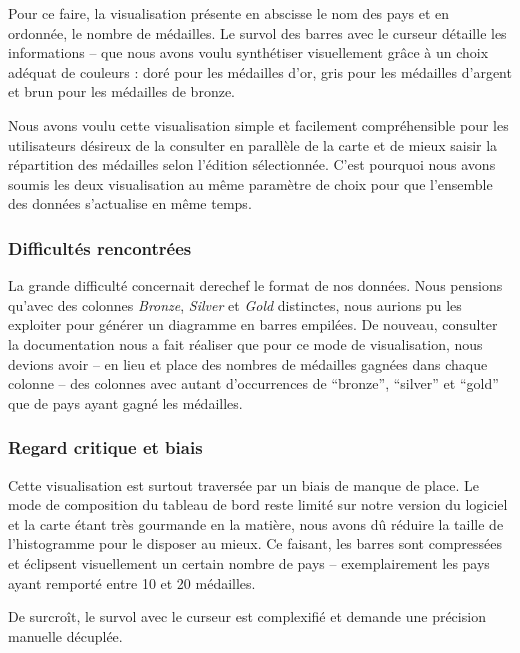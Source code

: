 \documentclass[hidelinks, 12pt]{report}
\begin{document}
Pour ce faire, la visualisation présente en abscisse le nom des pays et en ordonnée, le nombre de médailles. Le survol des barres avec le curseur détaille les informations -- que nous avons voulu synthétiser visuellement grâce à un choix adéquat de couleurs : doré pour les médailles d'or, gris pour les médailles d'argent et brun pour les médailles de bronze.

Nous avons voulu cette visualisation simple et facilement compréhensible pour les utilisateurs désireux de la consulter en parallèle de la carte et de mieux saisir la répartition des médailles selon l'édition sélectionnée. C'est pourquoi nous avons soumis les deux visualisation au même paramètre de choix pour que l'ensemble des données s'actualise en même temps.

\subsubsection{Difficultés rencontrées}

La grande difficulté concernait derechef le format de nos données. Nous pensions qu'avec des colonnes \textit{Bronze}, \textit{Silver} et \textit{Gold} distinctes, nous aurions pu les exploiter pour générer un diagramme en barres empilées. De nouveau, consulter la documentation nous a fait réaliser que pour ce mode de visualisation, nous devions avoir -- en lieu et place des nombres de médailles gagnées dans chaque colonne -- des colonnes avec autant d'occurrences de \enquote{bronze}, \enquote{silver} et \enquote{gold} que de pays ayant gagné les médailles.

\subsubsection{Regard critique et biais}

Cette visualisation est surtout traversée par un biais de manque de place. Le mode de composition du tableau de bord reste limité sur notre version du logiciel et la carte étant très gourmande en la matière, nous avons dû réduire la taille de l'histogramme pour le disposer au mieux. Ce faisant, les barres sont compressées et éclipsent visuellement un certain nombre de pays -- exemplairement les pays ayant remporté entre 10 et 20 médailles. 

De surcroît, le survol avec le curseur est complexifié et demande une précision manuelle décuplée.
\end{document}
